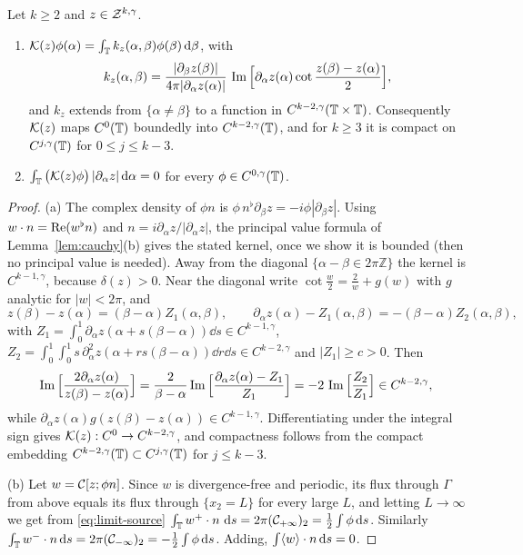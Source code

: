 \begin{lemma}\label{lem:K}
Let $k\ge2$ and $z\in\mathcal{Z}^{k,\gamma}$.
\begin{enumerate}[label=\textup{(\alph*)}]
\item $\mathcal{K}(z)\phi(\alpha)=\int_{\mathbb{T}} k_z(\alpha,\beta)\phi(\beta)\,\mathrm{d}\beta$, with
\[
k_z(\alpha,\beta)=\frac{|\partial_\beta z(\beta)|}{4\pi|\partial_\alpha z(\alpha)|}\,\operatorname{Im}\Big[\partial_\alpha z(\alpha)\cot\frac{z(\beta)-z(\alpha)}{2}\Big],
\]
and $k_z$ extends from $\{\alpha\neq\beta\}$ to a function in $C^{k-2,\gamma}(\mathbb{T}\times\mathbb{T})$. Consequently $\mathcal{K}(z)$ maps $C^0(\mathbb{T})$ boundedly into $C^{k-2,\gamma}(\mathbb{T})$, and for $k\ge3$ it is
compact on $C^{j,\gamma}(\mathbb{T})$ for $0\le j\le k-3$.
\item $\int_{\mathbb{T}}\big(\mathcal{K}(z)\phi\big)\,|\partial_\alpha z|\,\mathrm{d}\alpha=0$ for every $\phi\in C^{0,\gamma}(\mathbb{T})$.
\end{enumerate}
\end{lemma}

\begin{proof}
(a) The complex density of $\phi n$ is $\phi\, n^\flat\partial_\beta z=-i\phi|\partial_\beta z|$. Using $w\cdot n=\operatorname{Re}(w^\flat n)$ and $n=i\partial_\alpha z/|\partial_\alpha z|$, the principal value formula of
Lemma~\ref{lem:cauchy}(b) gives the stated kernel, once we show it is bounded (then no principal value is needed). Away from the diagonal $\{\alpha-\beta\in2\pi\mathbb Z\}$ the kernel is
$C^{k-1,\gamma}$, because $\delta(z)>0$. Near the diagonal write $\cot\frac w2=\frac2w+g(w)$ with $g$ analytic for $|w|<2\pi$, and
\[
z(\beta)-z(\alpha)=(\beta-\alpha)Z_1(\alpha,\beta),\qquad \partial_\alpha z(\alpha)-Z_1(\alpha,\beta)=-(\beta-\alpha)Z_2(\alpha,\beta),
\]
with $Z_1=\int_0^1\partial_\alpha z(\alpha+s(\beta-\alpha))\dd s\in C^{k-1,\gamma}$, $Z_2=\int_0^1\!\!\int_0^1 s\,\partial^2_\alpha z(\alpha+rs(\beta-\alpha))\dd r\dd s\in C^{k-2,\gamma}$ and $|Z_1|\ge c>0$. Then
\[
\operatorname{Im}\Big[\frac{2\partial_\alpha z(\alpha)}{z(\beta)-z(\alpha)}\Big]=\frac{2}{\beta-\alpha}\operatorname{Im}\Big[\frac{\partial_\alpha z(\alpha)-Z_1}{Z_1}\Big]=-2\,\operatorname{Im}\Big[\frac{Z_2}{Z_1}\Big]\in C^{k-2,\gamma},
\]
while $\partial_\alpha z(\alpha)g(z(\beta)-z(\alpha))\in C^{k-1,\gamma}$. Differentiating under the integral sign gives $\mathcal{K}(z):C^0\to C^{k-2,\gamma}$, and compactness follows from the compact
embedding $C^{k-2,\gamma}(\mathbb{T})\subset C^{j,\gamma}(\mathbb{T})$ for $j\le k-3$.

(b) Let $w=\mathcal{C}[z;\phi n]$. Since $w$ is divergence-free and periodic, its flux through $\Gamma$ from above equals its flux through $\{x_2=L\}$ for every large $L$, and letting $L\to\infty$ we get
from \eqref{eq:limit-source} $\int_{\mathbb{T}} w^+\cdot n\,\,\mathrm{d} s=2\pi(\mathcal{C}_{+\infty})_2=\frac12\int\phi\,\mathrm{d} s$. Similarly $\int_{\mathbb{T}} w^-\cdot n\,\mathrm{d} s=2\pi(\mathcal{C}_{-\infty})_2=-\frac12\int\phi\,\mathrm{d} s$. Adding,
$\int\langle w\rangle\cdot n\,\mathrm{d} s=0$.
\end{proof}

